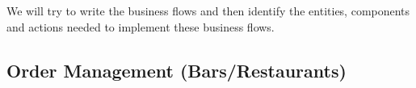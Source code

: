 \documentclass[]{VUMIFTemplateClass}
\begin{document}
We will try to write the business flows and then identify the entities,
components and actions needed to implement these business flows.








\subsection{Order Management (Bars/Restaurants)}
\end{document}
